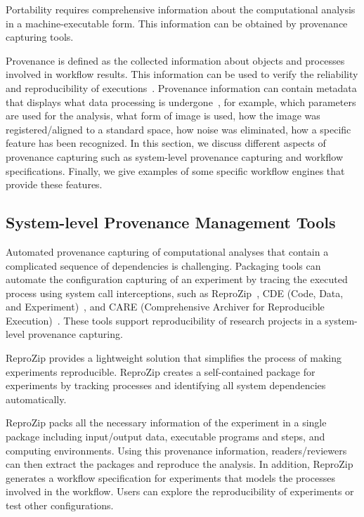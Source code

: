 Portability requires comprehensive 
information about the computational analysis in a machine-executable 
form. This information can be obtained by provenance capturing tools. 

Provenance is defined as the collected information about objects and 
processes involved in workflow results. This information can be 
used to verify the reliability and reproducibility of 
executions~\cite{missier2013w3c}. Provenance information can contain
metadata that displays what data processing is 
undergone~\cite{nichols2017best}, for example, which parameters are 
used for the analysis, what form of image is used, how the image was 
registered/aligned to a standard space, how noise was eliminated, how 
a specific feature has been recognized. 
In this section, we discuss different aspects 
of provenance capturing such as system-level provenance capturing and 
workflow specifications. Finally, we give examples of some specific 
workflow engines that provide these features. 

\subsection{System-level Provenance Management Tools}

Automated provenance capturing of computational analyses that 
contain a complicated sequence of dependencies is challenging. 
Packaging tools can automate the configuration capturing of 
an experiment by tracing the executed process using system call 
interceptions, such as ReproZip~\cite{chirigati2016reprozip}, CDE 
(Code, Data, and Experiment)~\cite{guo2012cde}, and CARE (Comprehensive 
Archiver for Reproducible Execution)~\cite{janin2014care}. These tools 
support reproducibility of research projects in a system-level 
provenance capturing. 

ReproZip provides a lightweight solution 
that simplifies the process of making experiments reproducible. 
ReproZip creates a self-contained package for experiments 
by tracking processes and identifying all system dependencies 
automatically. 

ReproZip packs all the necessary information of the experiment in a 
single package including input/output data, executable programs and 
steps, and computing environments. Using this provenance information, 
readers/reviewers can then extract the packages and reproduce the analysis. 
In addition, ReproZip generates a workflow specification for 
experiments that models the processes involved in the workflow. 
Users can explore the reproducibility of experiments or test 
other configurations. 

